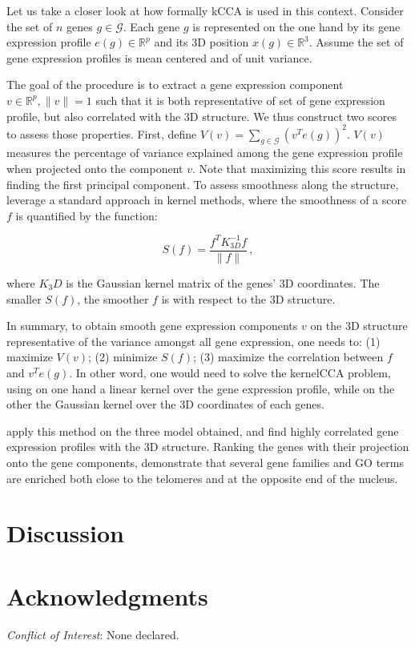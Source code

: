 \documentclass[letterpaper,12pt]{article}
\newcommand{\RR}{\mathbb{R}}
\begin{document}
Let us take a closer look at how formally kCCA is used in this context.
Consider the set of $n$ genes $g \in \mathcal{G}$. Each gene $g$ is
represented on the one hand by its gene expression profile $e(g) \in \RR^{p}$
and its 3D position $x(g) \in \RR^3$. Assume the set of gene expression
profiles is mean centered and of unit variance.

The goal of the procedure is to extract a gene expression component $v\in
\RR^p, \|v\|=1$ such that it is both representative of set of gene expression profile,
but also correlated with the 3D structure. We thus construct two scores to
assess those properties. First, define $V(v) = \underset{g \in
\mathcal{G}}{\sum} (v^T e(g))^2$. $V(v)$ measures the percentage of variance
explained among the gene expression profile when projected onto the component
$v$. Note that maximizing this score results in finding the first principal
component. To assess smoothness along the structure,
\citet{ay:three-dimensional} leverage a standard approach in kernel methods,
where the smoothness of a score $f$ is quantified by the function:

\begin{equation}
S(f) = \frac{f^TK^{-1}_{3D}f}{\|f\|}\,,
\end{equation}

where $K_3D$ is the Gaussian kernel matrix of the genes' 3D coordinates. The
smaller $S(f)$, the smoother $f$ is with respect to the 3D structure.

In summary, to obtain smooth gene expression components $v$ on the 3D
structure representative of the variance amongst all gene expression, one
needs to: (1) maximize $V(v)$; (2) minimize $S(f)$; (3) maximize the
correlation between $f$ and $v^T e(g)$. In other word, one would need to solve
the kernelCCA problem, using on one hand a linear kernel over the gene
expression profile, while on the other the Gaussian kernel over the 3D
coordinates of each genes.

\citet{ay:three-dimensional} apply this method on the three model obtained,
and find highly correlated gene expression profiles with the 3D structure.
Ranking the genes with their projection onto the gene components,
\citet{ay:three-dimensional} demonstrate that several gene families and GO
terms are enriched both close to the telomeres and at the opposite end of the
nucleus.


\section{Discussion}

\section*{Acknowledgments}



{\it Conflict of Interest}: None declared.






\begin{figure}[!p]
\centering
\caption{}
\label{Fig1}
\end{figure}
\end{document}
